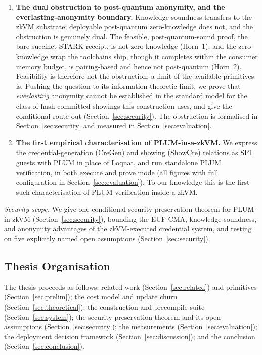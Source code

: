 \begin{enumerate}
  \item \textbf{The dual obstruction to post-quantum anonymity, and the everlasting-anonymity boundary.} Knowledge soundness transfers to the zkVM substrate; deployable post-quantum zero-knowledge does not, and the obstruction is genuinely dual. The feasible, post-quantum-sound proof, the bare succinct STARK receipt, is not zero-knowledge (Horn~1); and the zero-knowledge wrap the toolchains ship, though it completes within the consumer memory budget, is pairing-based and hence not post-quantum (Horn~2). Feasibility is therefore not the obstruction; a limit of the available primitives is. Pushing the question to its information-theoretic limit, we prove that \emph{everlasting} anonymity cannot be established in the standard model for the class of hash-committed showings this construction uses, and give the conditional route out (Section~\ref{sec:security}). The obstruction is formalised in Section~\ref{sec:security} and measured in Section~\ref{sec:evaluation}.

  \item \textbf{The first empirical characterisation of PLUM-in-a-zkVM.} We express the credential-generation (CreGen) and showing (ShowCre) relations as SP1 guests with PLUM in place of Loquat, and run standalone PLUM verification, in both execute and prove mode (all figures with full configuration in Section~\ref{sec:evaluation}). To our knowledge this is the first such characterisation of PLUM verification inside a zkVM. \end{enumerate}

\noindent\emph{Security scope.} We give one conditional security-preservation theorem for PLUM-in-zkVM (Section~\ref{sec:security}), bounding the EUF-CMA, knowledge-soundness, and anonymity advantages of the zkVM-executed credential system, and resting on five explicitly named open assumptions (Section~\ref{sec:security}).

\subsection{Thesis Organisation}
The thesis proceeds as follows: related work (Section~\ref{sec:related}) and primitives (Section~\ref{sec:prelim}); the cost model and update churn (Section~\ref{sec:theoretical}); the construction and precompile suite (Section~\ref{sec:system}); the security-preservation theorem and its open assumptions (Section~\ref{sec:security}); the measurements (Section~\ref{sec:evaluation}); the deployment decision framework (Section~\ref{sec:discussion}); and the conclusion (Section~\ref{sec:conclusion}).
